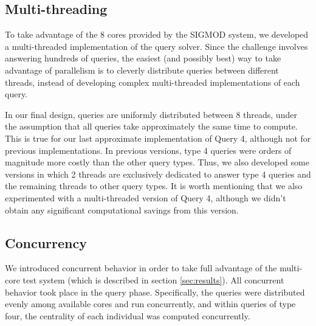 \documentclass{article}
\begin{document}
\subsection{Multi-threading}
To take advantage of the 8 cores provided by the SIGMOD system, we developed a 
multi-threaded implementation of the query solver. Since the challenge involves 
answering hundreds of queries, the easiest (and possibly best) way to take 
advantage of parallelism is to cleverly distribute queries between different
threads, instead of developing complex multi-threaded implementations of each 
query. 

In our final design, queries are uniformly distributed between 
8 threads, under the assumption that all queries take approximately the same time
to compute. This is true for our last approximate implementation of Query 4,
although not for previous implementations. In previous versions, type 4 queries were
orders of magnitude more costly than the other query types. Thus, we also 
developed some versions in which 2 threads are exclusively dedicated to answer 
type 4 queries and the remaining threads to other query types. 
It is worth mentioning that we also experimented with a multi-threaded version of Query 4,
 although we didn't obtain any significant computational savings from this version.

\subsection{Concurrency}
We introduced concurrent behavior in order to take full advantage of
the multi-core test system (which is described in section
\ref{sec:results}).  All concurrent behavior took place in the query
phase.  Specifically, the queries were distributed evenly among
available cores and run concurrently, and within queries of type four,
the centrality of each individual was computed concurrently.
\end{document}
